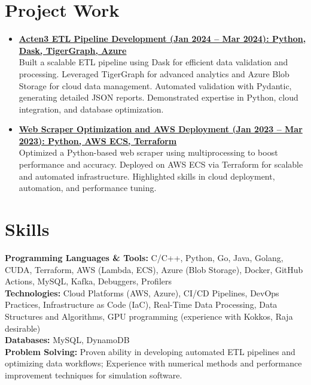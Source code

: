 \documentclass[a4paper,10pt]{article}
\begin{document}
\section{Project Work}
\begin{itemize}[nosep,after=\strut, leftmargin=2em, itemsep=2pt]
\item \textbf{\href{https://github.com/yash161/Acten3_Etl}{Acten3 ETL Pipeline Development (Jan 2024 – Mar 2024): Python, Dask, TigerGraph, Azure}} \\ Built a scalable ETL pipeline using Dask for efficient data validation and processing. Leveraged TigerGraph for advanced analytics and Azure Blob Storage for cloud data management. Automated validation with Pydantic, generating detailed JSON reports. Demonstrated expertise in Python, cloud integration, and database optimization.
\item \textbf{\href{https://github.com/yash161/Scrapper.git}{Web Scraper Optimization and AWS Deployment (Jan 2023 – Mar 2023): Python, AWS ECS, Terraform}} \\ Optimized a Python-based web scraper using multiprocessing to boost performance and accuracy. Deployed on AWS ECS via Terraform for scalable and automated infrastructure. Highlighted skills in cloud deployment, automation, and performance tuning.
\end{itemize}



\vspace{-1mm}
\section{Skills}
\color[HTML]{1C033C}\textbf{Programming Languages \& Tools:} C/C++, Python, Go, Java, Golang, CUDA,  Terraform, AWS (Lambda, ECS), Azure (Blob Storage), Docker, GitHub Actions, MySQL, Kafka, Debuggers, Profilers\\[1pt]
\color[HTML]{1C033C}\textbf{Technologies:} Cloud Platforms (AWS, Azure), CI/CD Pipelines, DevOps Practices, Infrastructure as Code (IaC), Real-Time Data Processing, Data Structures and Algorithms,  GPU programming (experience with Kokkos, Raja desirable)\\[1pt]
\color[HTML]{1C033C}\textbf{Databases:} MySQL, DynamoDB\\[1pt]
\color[HTML]{1C033C}\textbf{Problem Solving:} Proven ability in developing automated ETL pipelines and optimizing data workflows;  Experience with numerical methods and performance improvement techniques for simulation software.\\[1pt]
\vspace{-6mm}
\end{document}
